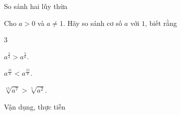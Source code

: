 \begin{dang}{So sánh hai lũy thừa}
\end{dang}

\begin{vd}%
	Cho $a>0$ và $a \ne 1$. Hãy so sánh cơ số $a$ với $1$,  biết rằng
	\begin{enumEX}[a)]{3}
	\item $ a^{\tfrac{3}{4}} > a^{\tfrac{5}{6}}$.
	\item $a^{\tfrac{11}{6}}< a^{\tfrac{15}{8}}$.
	\item $\sqrt[15]{a^7}>\sqrt[5]{a^2}$.
	\end{enumEX}
\end{vd} 

\begin{dang}{Vận dụng, thực tiễn}
\end{dang}


